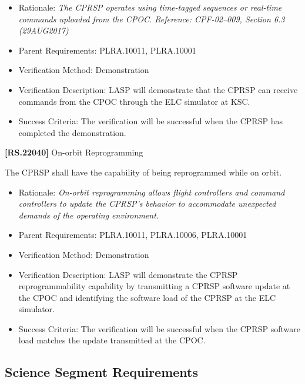 \begin{itemize}
\item{} Rationale: \emph{The CPRSP operates using time-tagged sequences or real-time commands uploaded from the CPOC. Reference: CPF-02--009, Section 6.3 (29AUG2017)}

\item{} Parent Requirements: PLRA.10011, PLRA.10001

\item{} Verification Method: Demonstration

\item{} Verification Description: \gls{LASP} will demonstrate that the \gls{CPRSP} can receive commands from the \gls{CPOC} through the \gls{ELC} simulator at \gls{KSC}.

\item{} Success Criteria: The verification will be successful when the \gls{CPRSP} has completed the \gls{demonstration}.

\end{itemize}

\textbf{[RS.22040]} On-orbit Reprogramming

The \gls{CPRSP} shall have the capability of being reprogrammed while on orbit.

\begin{itemize}
\item{} Rationale: \emph{On-orbit reprogramming allows flight controllers and command controllers to update the CPRSP's behavior to accommodate unexpected demands of the operating environment.}

\item{} Parent Requirements: PLRA.10011, PLRA.10006, PLRA.10001

\item{} Verification Method: Demonstration

\item{} Verification Description: \gls{LASP} will demonstrate the \gls{CPRSP} reprogrammability capability by transmitting a \gls{CPRSP} software update at the \gls{CPOC} and identifying the software load of the \gls{CPRSP} at the \gls{ELC} simulator.

\item{} Success Criteria: The verification will be successful when the \gls{CPRSP} software load matches the update transmitted at the \gls{CPOC}.

\end{itemize}

\subsection{Science Segment Requirements}
\label{sciencesegmentrequirements}

